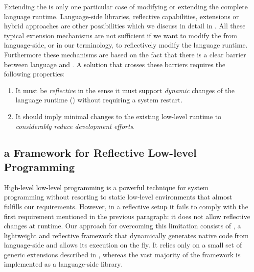 Extending the \VM is only one particular case of modifying or extending the complete language runtime.
Language-side libraries, reflective capabilities, \VM extensions or hybrid approaches are other possibilities which we discuss in detail in .
All these typical extension mechanisms are not sufficient if we want to modify the \VM from language-side, or in our terminology, to reflectively modify the language runtime. Furthermore these mechanisms are based on the fact that there is a clear barrier between language and \VM.
A solution that crosses these barriers requires the following properties:

\begin{enumerate}
	\item It must be \emph{reflective} in the sense it must support \emph{dynamic} changes of the language runtime (\VM) without requiring a system restart.
	\item It should imply minimal changes to the existing low-level runtime to \emph{considerably reduce development efforts}.
\end{enumerate}


\subsection{\B a Framework for Reflective Low-level Programming}

High-level low-level programming is a powerful technique for system programming without resorting to static low-level environments \cite{Fram09a,Wimm13a} that almost fulfills our requirements.
However, in a reflective setup it fails to comply with the first requirement mentioned in the previous paragraph: it does not allow reflective changes at runtime.
Our approach for overcoming this limitation consists of \B, a lightweight and reflective framework that dynamically generates native code from language-side and allows its execution on the fly.
It relies only on a small set of generic \VM extensions described in , whereas the vast majority of the framework is implemented as a language-side library.


